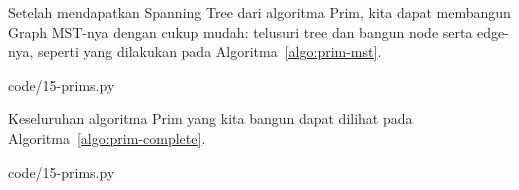 Setelah mendapatkan Spanning Tree dari algoritma Prim, kita dapat membangun Graph MST-nya dengan cukup mudah: telusuri tree dan bangun node serta edge-nya, seperti yang dilakukan pada Algoritma~\ref{algo:prim-mst}.


                {code/15-prims.py}

Keseluruhan algoritma Prim yang kita bangun dapat dilihat pada Algoritma~\ref{algo:prim-complete}.


                {code/15-prims.py}
